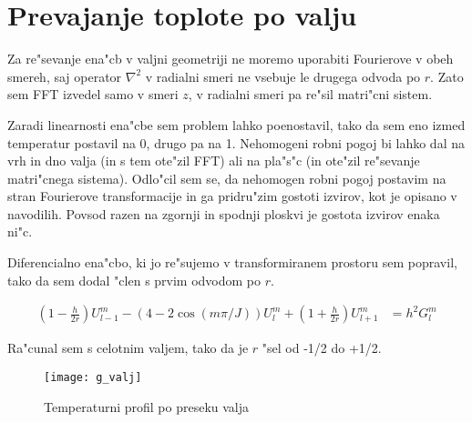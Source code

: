 \documentclass[a4paper,10pt]{article}
\begin{document}
\section{Prevajanje toplote po valju}

Za re"sevanje ena"cb v valjni geometriji ne moremo uporabiti Fourierove v obeh smereh, saj operator $\nabla^2$ v radialni smeri ne vsebuje le drugega odvoda po $r$. Zato sem FFT izvedel samo v smeri $z$, v radialni smeri pa re"sil matri"cni sistem. 

Zaradi linearnosti ena"cbe sem problem lahko poenostavil, tako da sem eno izmed temperatur postavil na 0, drugo pa na 1. Nehomogeni robni pogoj bi lahko dal na vrh in dno valja (in s tem ote"zil FFT) ali na pla"s"c (in ote"zil re"sevanje matri"cnega sistema). Odlo"cil sem se, da nehomogen robni pogoj postavim na stran Fourierove transformacije in ga pridru"zim gostoti izvirov, kot je opisano v navodilih. Povsod razen na zgornji in spodnji ploskvi je gostota izvirov enaka ni"c. 

Diferencialno ena"cbo, ki jo re"sujemo v transformiranem prostoru sem popravil, tako da sem dodal "clen s prvim odvodom po $r$. 

\begin{align}
 (1-\frac{h}{2r}) U^m_{l-1} - (4-2\cos(m\pi/J)) U^m_l + (1+\frac{h}{2r}) U^m_{l+1} &= h^2 G^m_l
\end{align}

Ra"cunal sem s celotnim valjem, tako da je $r$ "sel od -1/2 do +1/2. 

\begin{figure}[H]
\centering
 \texttt{[image: g\_valj]}
 \caption{Temperaturni profil po preseku valja}
 \label{fig:valj}
\end{figure}
\end{document}
